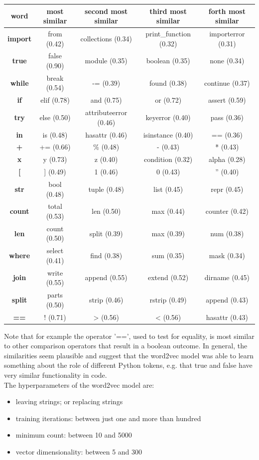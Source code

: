 \documentclass[
	a4paper,
	pagesize,
	pdftex,
	12pt,
	twoside, %
	BCOR=5mm, %
	ngerman,
	fleqn,
	final,
	]{scrartcl}
\begin{document}
\footnotesize
\begin{center}
	\begin{tabular}{ |c|c|c|c|c| } 
		\hline
		\textbf{word} & \textbf{ most similar} &\textbf{ second most similar} & \textbf{third most similar}& \textbf{forth most similar}\\ 
		\hline
		\textbf{import} & from (0.42) & collections (0.34) & print\_function (0.32) & importerror (0.31)\\ 
		\textbf{true} & false (0.90) & module (0.35) & boolean (0.35) & none (0.34)\\  
		\textbf{while} & break (0.54)  & -= (0.39) & found (0.38) & continue (0.37) \\
		\textbf{if} & elif (0.78)  & and (0.75) & or (0.72) & assert (0.59) \\
		\textbf{try} & else (0.50)  & attributeerror (0.46) & keyerror (0.40) & pass (0.36) \\
		\textbf{in} & is (0.48)  & hasattr (0.46) & isinstance (0.40) & == (0.36) \\
		\textbf{+} & += (0.66)  & \% (0.48) & - (0.43) & * (0.43) \\
		\textbf{x} & y (0.73)  & z (0.40) & condition (0.32) & alpha (0.28) \\
		\textbf{[} & ] (0.49)  & 1 (0.46) & 0 (0.43) & '' (0.40) \\
		\textbf{str} & bool (0.48)  & tuple (0.48) & list (0.45) & repr (0.45) \\
		\textbf{count} & total (0.53)  & len (0.50) & max (0.44) & counter (0.42) \\
		\textbf{len} & count (0.50)  & split (0.39) & max (0.39) & num (0.38) \\
		\textbf{where} & select (0.41)  & find (0.38) & sum (0.35) & mask (0.34) \\
		\textbf{join} & write (0.55)  & append (0.55) & extend (0.52) & dirname (0.45) \\
		\textbf{split} & parts (0.50)  & strip (0.46) & rstrip (0.49) & append (0.43) \\
		\textbf{==} & ! (0.71)  & > (0.56) & < (0.56) & hasattr (0.43) \\
		\hline
	\end{tabular}
\end{center}
\normalsize

Note that for example the operator '==', used to test for equality, is most similar to other comparison operators that result in a boolean outcome. In general, the similarities seem plausible and suggest that the word2vec model was able to learn something about the role of different Python tokens, e.g. that true and false have very similar functionality in code.\\ 
The hyperparameters of the word2vec model are:
\begin{itemize}[noitemsep]
	\item leaving strings; or replacing strings
	\item training iterations: between just one and more than hundred
	\item minimum count: between 10 and 5000
	\item vector dimensionality: between 5 and 300
\end{itemize}
\end{document}
